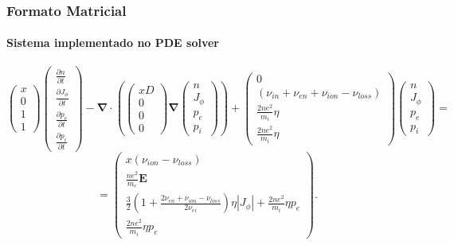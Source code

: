 \documentclass[aspectratio=169]{beamer}
\begin{document}
\begin{frame}
\frametitle{Formato Matricial}
\framesubtitle{Sistema implementado no PDE solver}
\begin{displaymath}
\left(\begin{array}{c}
x \\
0\\
1\\
1
\end{array}\right)
\left(\begin{array}{c}
\frac{\partial n}{\partial t}\\
\frac{\partial J_\phi}{\partial t}\\
\frac{\partial p_e}{\partial t}\\
\frac{\partial p_i}{\partial t}
\end{array}\right) - \bm{\nabla} \cdot \left( \left(\begin{array}{c}
x D\\
0\\
0\\
0
\end{array}\right) \bm{\nabla} \left(\begin{array}{c}
n\\
J_\phi\\
p_e\\
p_i
\end{array}\right) \right) + \left(\begin{array}{c}
0\\
(\nu_{in}+\nu_{en}+\nu_{ion}-\nu_{loss})\\
\frac{2ne^2}{m_i} \eta\\
\frac{2ne^2}{m_i} \eta
\end{array}\right)\left(\begin{array}{c}
n\\
J_\phi\\
p_e\\
p_i
\end{array}\right) =
\end{displaymath}
\begin{displaymath}
= \left(\begin{array}{c}
x ( \nu_{ion} - \nu_{loss} )\\
\frac{ne^2}{m_e} \bm{E} \\
\frac{3}{2}(1+\frac{2 \nu_{en} + \nu_{ion} - \nu_{loss}}{2\nu_{ei}})\eta |J_\phi|  +\frac{2ne^2}{m_i} \eta p_e\\
\frac{2ne^2}{m_i}\eta p_e
\end{array}\right).
\end{displaymath}

\end{frame}	
	
\end{document}
